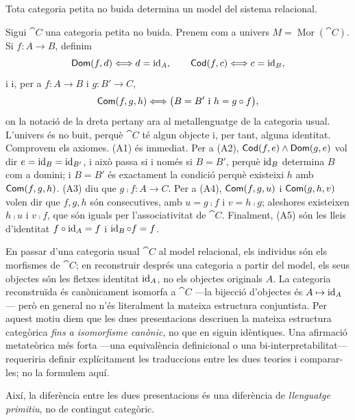 \begin{teorema}[recíproc]
\label{th:ar-categoria-a-model}
Tota categoria petita no buida determina un model del sistema relacional.
\end{teorema}

\begin{prova}
Sigui $\cat{C}$ una categoria petita no buida. Prenem com a univers $M=\operatorname{Mor}(\cat{C})$. Si $f\colon A\to B$, definim
\[
\mathsf{Dom}(f,d)\Longleftrightarrow d=\operatorname{id}_A,
\qquad
\mathsf{Cod}(f,c)\Longleftrightarrow c=\operatorname{id}_B,
\]
i
i, per a $f\colon A\to B$ i $g\colon B'\to C$,
\[
\Com(f,g,h)\Longleftrightarrow \bigl(B=B'\ \text{i}\ h=g\comp f\bigr),
\]
on la notació de la dreta pertany ara al metallenguatge de la categoria usual. L'univers és no buit, perquè $\cat{C}$ té algun objecte i, per tant, alguna identitat. Comprovem els axiomes. (A1) és immediat. Per a (A2), $\mathsf{Cod}(f,e)\land\mathsf{Dom}(g,e)$ vol dir $e=\operatorname{id}_B=\operatorname{id}_{B'}$, i això passa si i només si $B=B'$, perquè $\operatorname{id}_B$ determina $B$ com a domini; i $B=B'$ és exactament la condició perquè existeixi $h$ amb $\mathsf{Com}(f,g,h)$. (A3) diu que $g\comp f\colon A\to C$. Per a (A4), $\mathsf{Com}(f,g,u)$ i $\mathsf{Com}(g,h,v)$ volen dir que $f,g,h$ són consecutives, amb $u=g\comp f$ i $v=h\comp g$; aleshores existeixen $h\comp u$ i $v\comp f$, que són iguals per l'associativitat de $\cat{C}$. Finalment, (A5) són les lleis d'identitat $f\circ\operatorname{id}_A=f$ i $\operatorname{id}_B\circ f=f$.
\end{prova}

\begin{observacio}
En passar d'una categoria usual $\cat{C}$ al model relacional, els individus són els morfismes de $\cat{C}$; en reconstruir després una categoria a partir del model, els seus objectes són les fletxes identitat $\operatorname{id}_A$, no els objectes originals $A$. La categoria reconstruïda és canònicament isomorfa a $\cat{C}$ ---la bijecció d'objectes és $A\mapsto\operatorname{id}_A$--- però en general no n'és literalment la mateixa estructura conjuntista. Per aquest motiu diem que les dues presentacions descriuen la mateixa estructura categòrica \emph{fins a isomorfisme canònic}, no que en siguin idèntiques. Una afirmació metateòrica més forta ---una equivalència definicional o una bi-interpretabilitat--- requeriria definir explícitament les traduccions entre les dues teories i comparar-les; no la formulem aquí.

\end{observacio}

Així, la diferència entre les dues presentacions és una diferència de \emph{llenguatge primitiu}, no de contingut categòric.

